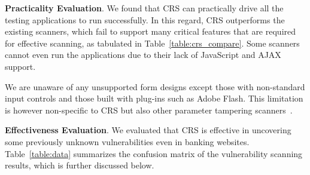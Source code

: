 \documentclass[letter]{sig-alternate-2013}
\begin{document}
\textbf{Practicality Evaluation}. We found that CRS can practically drive all the testing applications to run successfully. In this regard, CRS outperforms the existing scanners, which fail to support many critical features that are required for effective scanning, as tabulated in Table~\ref{table:crs_compare}. Some scanners cannot even run the applications due to their lack of JavaScript and AJAX support. 

We are unaware of any unsupported form designs except those with non-standard input controls and those built with plug-ins such as Adobe Flash. This limitation is however non-specific to CRS but also other parameter tampering scanners~\cite{notamper,waptec,acunetix,tamperdata}.

\textbf{Effectiveness Evaluation}. We evaluated that CRS is effective in uncovering some previously unknown vulnerabilities even in banking websites. Table~\ref{table:data} summarizes the confusion matrix of the vulnerability scanning results, which is further discussed below.
\end{document}
